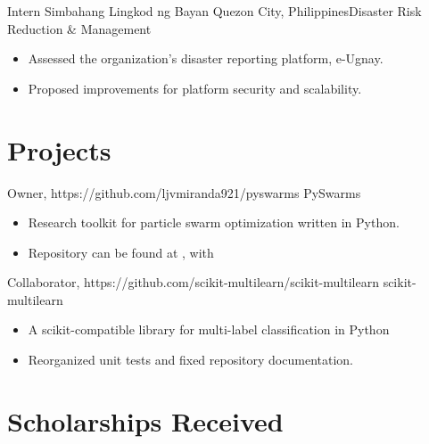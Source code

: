 \documentclass[11pt,a4paper,sans]{moderncv}
\begin{document}
\vspace{0.75em}
        {Intern}
        {Simbahang Lingkod ng Bayan}
        {Quezon City, Philippines}{Disaster Risk Reduction \& Management}
        {
            \begin{itemize}
                \item Assessed the organization's disaster reporting platform, e-Ugnay.
                \item Proposed improvements for platform security and scalability.
            \end{itemize}
        }


\section{Projects}

        {Owner, https://github.com/ljvmiranda921/pyswarms}
        {PySwarms}{}{}
        {
            \begin{itemize}
                \item Research toolkit for particle swarm optimization written in Python.
                \item Repository can be found at {\color{blue} }, with {\color{blue}}
            \end{itemize}
        }

        {Collaborator, https://github.com/scikit-multilearn/scikit-multilearn}
        {scikit-multilearn}{}{}
        {
            \begin{itemize}
                \item A scikit-compatible library for multi-label classification in Python
                \item Reorganized unit tests and fixed repository documentation.
            \end{itemize}
        }

\section{Scholarships Received}
\end{document}
